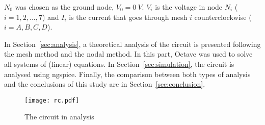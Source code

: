 \par
$N_0$ was chosen as the ground node, $V_0 = 0 \ V$. $V_i$ is the voltage in node $N_i$ ($i=1, 2, ..., 7$) and $I_i$  is the current that goes through mesh $i$ counterclockwise ($i=A, B, C, D$).


\par
In Section~\ref{sec:analysis}, a theoretical analysis of the circuit is presented following the mesh method and the nodal method. In this part, Octave was used to solve all systems of (linear) equations. In Section~\ref{sec:simulation}, the circuit is analysed using ngspice. Finally, the comparison between both types of analysis and the conclusions of this study are in Section~\ref{sec:conclusion}.

\begin{figure}[h] \centering
\texttt{[image: rc.pdf]}
\caption{The circuit in analysis}
\label{fig:rc}
\end{figure}
